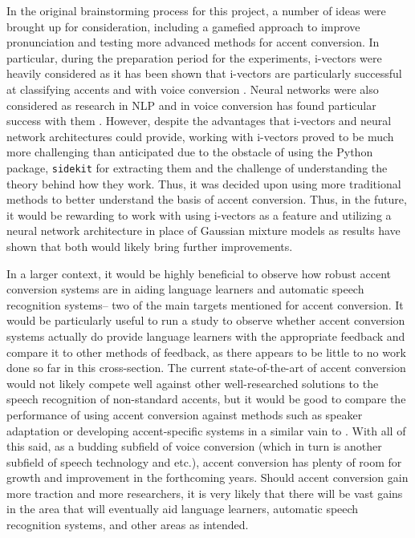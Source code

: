 \documentclass
[
    a4paper,
    twoside,
    12pt,
]
{report}
\begin{document}
In the original brainstorming process for this project, a number of
ideas were brought up for consideration, including a gamefied approach
to improve pronunciation and testing more advanced methods for accent
conversion. In particular, during the preparation period for the
experiments, i-vectors were heavily considered as it has been shown that
i-vectors are particularly successful at classifying accents
\parencite{demarco2013} and with voice conversion
\parencite{wu2010, kinnunen2017}. Neural networks were also considered
as research in NLP and in voice conversion has found particular success
with them \parencite{chen2014, chorowski2017, lorenzo-trueba2018}.
However, despite the advantages that i-vectors and neural network
architectures could provide, working with i-vectors proved to be much
more challenging than anticipated due to the obstacle of using the
Python package, \texttt{sidekit} for extracting them and the challenge
of understanding the theory behind how they work. Thus, it was decided
upon using more traditional methods to better understand the basis of
accent conversion. Thus, in the future, it would be rewarding to work
with using i-vectors as a feature and utilizing a neural network
architecture in place of Gaussian mixture models as results have shown
that both would likely bring further improvements.

In a larger context, it would be highly beneficial to observe how robust
accent conversion systems are in aiding language learners and automatic
speech recognition systems-- two of the main targets mentioned for
accent conversion. It would be particularly useful to run a study to
observe whether accent conversion systems actually do provide language
learners with the appropriate feedback and compare it to other methods
of feedback, as there appears to be little to no work done so far in
this cross-section. The current state-of-the-art of accent conversion
would not likely compete well against other well-researched solutions to
the speech recognition of non-standard accents, but it would be good to
compare the performance of using accent conversion against methods such
as speaker adaptation or developing accent-specific systems in a similar
vain to \textcite{najafian2014}. With all of this said, as a budding
subfield of voice conversion (which in turn is another subfield of
speech technology and etc.), accent conversion has plenty of room for
growth and improvement in the forthcoming years. Should accent
conversion gain more traction and more researchers, it is very likely
that there will be vast gains in the area that will eventually aid
language learners, automatic speech recognition systems, and other areas
as intended.
\cleardoublepage
\end{document}
